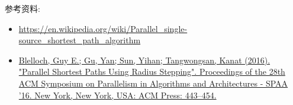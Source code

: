 \documentclass[a4paper, justified]{tufte-handout}
\begin{document}

\begin{ot}
	
	\noindent 参考资料:
	\begin{itemize}
		\item \href{https://en.wikipedia.org/wiki/Parallel_single-source_shortest_path_algorithm}{https://en.wikipedia.org/wiki/Parallel\_single-source\_shortest\_path\_algorithm}
		\item \href{https://dl.acm.org/doi/10.1145/2935764.2935765} {Blelloch, Guy E.; Gu, Yan; Sun, Yihan; Tangwongsan, Kanat (2016). "Parallel Shortest Paths Using Radius Stepping". Proceedings of the 28th ACM Symposium on Parallelism in Algorithms and Architectures - SPAA '16. New York, New York, USA: ACM Press: 443–454.}
	\end{itemize}
		
\end{ot}





% 




\beginfb

% 
% 
\end{document}
